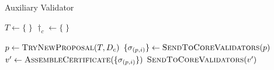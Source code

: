 \begin{algorithm}[t]
    \caption{Auxiliary Validator}
    \label{alg:auxiliary-validator}
    \scriptsize

    \begin{algorithmic}[1]
        \State $T \gets \{ \; \}$ 
        \State $\dag_c \gets \{ \; \}$ 

        \Statex
        \State $p \gets \Call{TryNewProposal}{T, \dag_c}$
         \Return \EndIf
        \State $\{ \sigma_{(p,i)} \} \gets \Call{SendToCoreValidators}{p}$
        \State $v' \gets \Call{AssembleCertificate}{\{ \sigma_{(p,i)} \}}$
        \State $\Call{SendToCoreValidators}{v'}$
        \EndProcedure
    \end{algorithmic}
\end{algorithm}